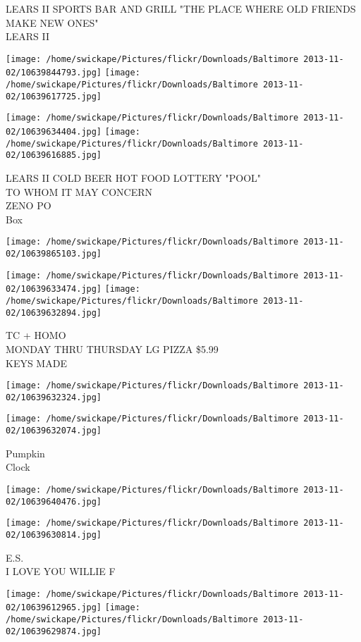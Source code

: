 \documentclass[10pt,letterpaper]{article}
\begin{document}
LEARS II SPORTS BAR AND GRILL "THE PLACE WHERE OLD FRIENDS MAKE NEW ONES"\\
LEARS II
\pagebreak

\texttt{[image: /home/swickape/Pictures/flickr/Downloads/Baltimore 2013-11-02/10639844793.jpg]}
\texttt{[image: /home/swickape/Pictures/flickr/Downloads/Baltimore 2013-11-02/10639617725.jpg]}

\texttt{[image: /home/swickape/Pictures/flickr/Downloads/Baltimore 2013-11-02/10639634404.jpg]}
\texttt{[image: /home/swickape/Pictures/flickr/Downloads/Baltimore 2013-11-02/10639616885.jpg]}

LEARS II COLD BEER HOT FOOD LOTTERY "POOL"\\
TO WHOM IT MAY CONCERN\\
ZENO PO\\
Box
\pagebreak

\texttt{[image: /home/swickape/Pictures/flickr/Downloads/Baltimore 2013-11-02/10639865103.jpg]}

\vspace{0.25in}
\texttt{[image: /home/swickape/Pictures/flickr/Downloads/Baltimore 2013-11-02/10639633474.jpg]}
\texttt{[image: /home/swickape/Pictures/flickr/Downloads/Baltimore 2013-11-02/10639632894.jpg]}

TC + HOMO\\
MONDAY THRU THURSDAY LG PIZZA \$5.99\\
KEYS MADE
\pagebreak

\texttt{[image: /home/swickape/Pictures/flickr/Downloads/Baltimore 2013-11-02/10639632324.jpg]}

\vspace{0.25in}
\texttt{[image: /home/swickape/Pictures/flickr/Downloads/Baltimore 2013-11-02/10639632074.jpg]}

Pumpkin\\
Clock
\pagebreak

\texttt{[image: /home/swickape/Pictures/flickr/Downloads/Baltimore 2013-11-02/10639640476.jpg]}

\vspace{0.25in}
\texttt{[image: /home/swickape/Pictures/flickr/Downloads/Baltimore 2013-11-02/10639630814.jpg]}

E.S.\\
I LOVE YOU WILLIE F
\pagebreak

\texttt{[image: /home/swickape/Pictures/flickr/Downloads/Baltimore 2013-11-02/10639612965.jpg]}
\texttt{[image: /home/swickape/Pictures/flickr/Downloads/Baltimore 2013-11-02/10639629874.jpg]}
\end{document}
